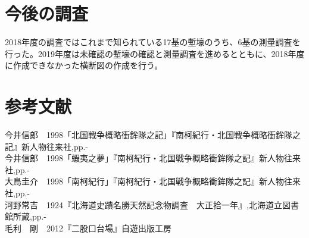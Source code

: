 \documentclass[14Q]{jsarticle}
\begin{document}
\section{今後の調査}
2018年度の調査ではこれまで知られている17基の塹壕のうち、6基の測量調査を行った。2019年度は未確認の塹壕の確認と測量調査を進めるとともに、2018年度に作成できなかった横断図の作成を行う。


\section*{参考文献}
\noindent
今井信郎　1998「北国戦争概略衝鉾隊之記」『南柯紀行・北国戦争概略衝鉾隊之記』新人物往来社,pp.-\\
今井信郎　1998「蝦夷之夢」『南柯紀行・北国戦争概略衝鉾隊之記』新人物往来社,pp.-\\
大鳥圭介　1998「南柯紀行」『南柯紀行・北国戦争概略衝鉾隊之記』新人物往来社,pp.-\\
河野常吉　1924『北海道史蹟名勝天然記念物調査　大正拾一年』,北海道立図書館所蔵,pp.-\\
毛利　剛　2012『二股口台場』自遊出版工房
\end{document}
